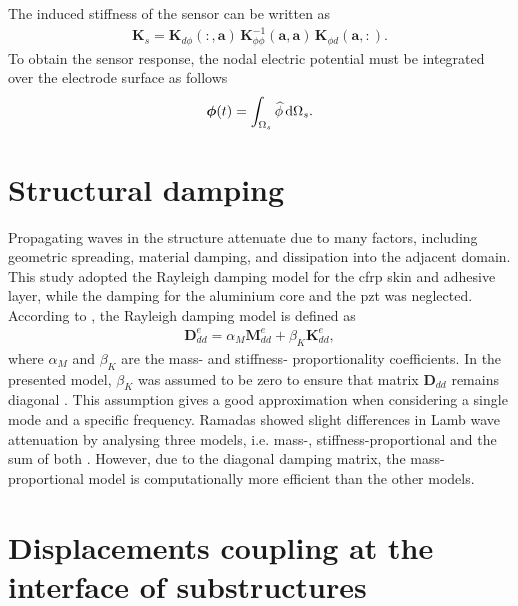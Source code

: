 \documentclass[11pt,a4paper,final]{report}
\theoremstyle{plain}
\begin{document}
The induced stiffness of the sensor can be written as
\begin{eqnarray} \textbf{K}_s=\textbf{K}_{d \phi}(:,\textbf{a})\,\textbf{K}_{\phi \phi}^{-1} (\textbf{a},\textbf{a})\,\textbf{K}_{\phi d}(\textbf{a},:).
\end{eqnarray}
To obtain the sensor response, the nodal electric potential must be integrated over the electrode surface as follows
\begin{eqnarray}
	\boldsymbol{\phi}(t) = \int_{\Omega_s}\widehat{\phi} \mathop{}\!\mathrm{d}\Omega_s.
	\label{eq:sensorResponse}
\end{eqnarray} \section{Structural damping}
\label{sec:damping}

Propagating waves in the structure attenuate due to many factors, including geometric spreading, material damping, and dissipation into the adjacent domain.
This study adopted the Rayleigh damping model for the \ac{cfrp} skin and adhesive layer, while the damping for the aluminium core and the \ac{pzt} was neglected.
According to \cite{wandowski2017guided}, the Rayleigh damping model is defined as
\begin{eqnarray}
	\textbf{D}_{dd}^e = \alpha_M \textbf{M}_{dd}^e + \beta_K \textbf{K}_{dd}^e,
	\label{eq:damping}
\end{eqnarray}
where \(\alpha_M\) and \(\beta_K\) are the mass- and stiffness- proportionality coefficients.
In the presented model, \(\beta_K\) was assumed to be zero to ensure that matrix \(\textbf{D}_{dd}\) remains diagonal \cite{schulte2011simulation, wandowski2017guided}.
This assumption gives a good approximation when considering a single mode and a specific frequency. 
Ramadas showed slight differences in Lamb wave attenuation by analysing three models, i.e. mass-, stiffness-proportional and the sum of both \cite{ramadas2011modelling}.
However, due to the diagonal damping matrix, the mass-proportional model is computationally more efficient than the other models. \section{Displacements coupling at the interface of substructures}
\label{sec:interface}
\end{document}
